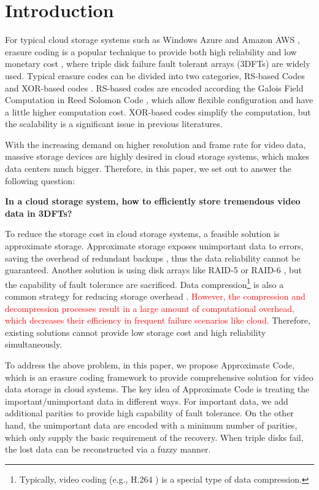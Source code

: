 \documentclass[sigconf]{acmart}
\begin{document}
\section{Introduction}
For typical cloud storage systems such as Windows Azure \cite{calder2011windows} and Amazon AWS \cite{bermudez2013exploring}, erasure coding is a popular technique to provide both high reliability and low monetary cost \cite{EVENODD, RDP, BlaumRoth, XCode, CRS, TripleStar, TPtech, RSL}, where triple disk failure fault tolerant arrays (3DFTs) are widely used. Typical erasure codes can be divided into two categories, RS-based Codes \cite{RS} \cite{LRC} and XOR-based codes \cite{EVENODD, hcode, STAR, tip}. RS-based codes are encoded according the Galois Field Computation in Reed Solomon Code \cite{RS}, which allow flexible configuration and have a little higher computation cost. XOR-based codes simplify the computation, but the scalability is a significant issue in previous literatures.

With the increasing demand on higher resolution and frame rate for video data, massive storage devices are highly desired in cloud storage systems, which makes data centers much bigger.
Therefore, in this paper, we set out to answer the following question:

\textbf{In a cloud storage system, how to efficiently store tremendous video data in 3DFTs?}

To reduce the storage cost in cloud storage systems, a feasible solution is approximate storage. Approximate storage exposes unimportant data to errors, saving the overhead of redundant backups \cite{niklaus2018context, sampson2014approximate} , thus the data reliability cannot be guaranteed.
Another solution is using disk arrays like RAID-5 or RAID-6 \cite{RAID}, but the capability of fault tolerance are sacrificed.
Data compression\footnote{Typically, video coding (e.g., H.264 \cite{wiegand2003overview}) is a special type of data compression.} is also a common strategy for reducing storage overhead \cite{ziv1977universal, ziv1978compression, deutsch1996deflate}.
\textcolor{red}{However, the compression and decompression processes result in a large amount of computational overhead, which decreases their efficiency in frequent failure scenarios like cloud.}
Therefore, existing solutions cannot provide low storage cost and high reliability simultaneously.

To address the above problem, in this paper, we propose Approximate Code, which is an erasure coding framework to provide comprehensive solution for video data storage in cloud systems. The key idea of Approximate Code is treating the important/unimportant data in different ways. For important data, we add additional parities to provide high capability of fault tolerance. On the other hand, the unimportant data are encoded with a minimum number of parities, which only supply the basic requirement of the recovery. When triple disks fail, the lost data can be reconstructed via a fuzzy manner.
\end{document}
